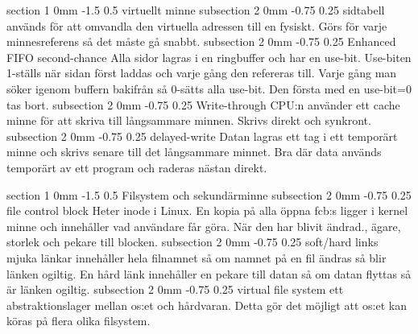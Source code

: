 \documentclass[a4paper,11pt]{article}
\makeatletter
\renewcommand{\section}{\@startsection
   {section}%
   {1}%
   {0mm}%
   {-1.5\baselineskip}%
   {0.5\baselineskip}%
   {\sffamily\bfseries\upshape\normalsize}}%
\renewcommand{\subsection}{\@startsection
   {subsection}%
   {2}%
   {0mm}%
   {-0.75\baselineskip}%
   {0.25\baselineskip}%
   {\rmfamily\normalfont\slshape\normalsize}}%
\makeatother
\begin{document}
\section{virtuellt minne}
\subsection{sidtabell}
används för att omvandla den virtuella adressen till en fysiskt. Görs för varje minnesreferens så det måste gå snabbt. 
\subsection{Enhanced FIFO second-chance}
Alla sidor lagras i en ringbuffer och har en use-bit. Use-biten 1-ställs när sidan först laddas och varje gång den refereras till. Varje gång man söker igenom buffern bakifrån så 0-sätts alla use-bit. Den första med en use-bit=0 tas bort.
\subsection{Write-through}
CPU:n använder ett cache minne för att skriva till långsammare minnen. Skrivs direkt och synkront.
\subsection{delayed-write}
Datan lagras ett tag i ett temporärt minne och skrivs senare till det långsammare minnet. Bra där data används temporärt av ett program och raderas nästan direkt.

\section{Filsystem och sekundärminne}
\subsection{file control block}
Heter inode i Linux. En kopia på alla öppna fcb:s ligger i kernel minne och innehåller vad användare får göra. När den har blivit ändrad., ägare, storlek och pekare till blocken.
\subsection{soft/hard links}
mjuka länkar innehåller hela filnamnet så om namnet på en fil ändras så blir länken ogiltig. En hård länk innehåller en pekare till datan så om datan flyttas så är länken ogiltig.
\subsection{virtual file system}
ett abstraktionslager mellan os:et och hårdvaran. Detta gör det möjligt att os:et kan köras på flera olika filsystem. 
\end{document}
